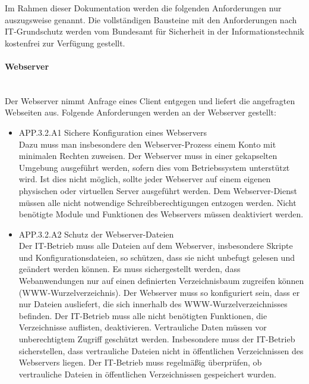 Im Rahmen dieser Dokumentation werden die folgenden Anforderungen nur auszugsweise genannt. Die vollst\"andigen Bausteine mit den Anforderungen nach IT-Grundschutz werden vom Bundesamt f\"ur Sicherheit in der Informationstechnik kostenfrei zur Verf\"ugung gestellt.

\paragraph{Webserver}
\noindent \\Der Webserver nimmt Anfrage eines Client entgegen und liefert die angefragten Webseiten aus. Folgende Anforderungen werden an der Webserver gestellt:
  \begin{itemize}
      \item APP.3.2.A1 Sichere Konfiguration eines Webservers\\
			Dazu muss man insbesondere den Webserver-Prozess einem Konto mit minimalen Rechten zuweisen. Der Webserver muss in einer gekapselten Umgebung ausgef\"uhrt werden, sofern dies vom Betriebssystem unterst\"utzt wird. Ist dies nicht m\"oglich, sollte jeder Webserver auf einem eigenen physischen oder virtuellen Server ausgef\"uhrt werden. Dem Webserver-Dienst m\"ussen alle nicht notwendige Schreibberechtigungen entzogen werden. Nicht ben\"otigte Module und Funktionen des Webservers m\"ussen deaktiviert werden.\\
			
			\item APP.3.2.A2 Schutz der Webserver-Dateien\\
			Der IT-Betrieb muss alle Dateien auf dem Webserver, insbesondere Skripte und Konfigurationsdateien, so sch\"utzen, dass sie nicht unbefugt gelesen und ge\"andert werden k\"onnen. Es muss sichergestellt werden, dass Webanwendungen nur auf einen definierten Verzeichnisbaum zugreifen k\"onnen (WWW-Wurzelverzeichnis). Der Webserver muss so konfiguriert sein, dass er nur Dateien ausliefert, die sich innerhalb des WWW-Wurzelverzeichnisses befinden. Der IT-Betrieb muss alle nicht ben\"otigten Funktionen, die Verzeichnisse auflisten, deaktivieren. Vertrauliche Daten m\"ussen vor unberechtigtem Zugriff gesch\"utzt werden. Insbesondere muss der
IT-Betrieb sicherstellen, dass vertrauliche Dateien nicht in \"offentlichen Verzeichnissen des Webservers liegen. Der IT-Betrieb muss regelm\"a{\ss}ig \"uberpr\"ufen, ob vertrauliche Dateien in \"offentlichen Verzeichnissen gespeichert wurden.\\


\end{itemize}
